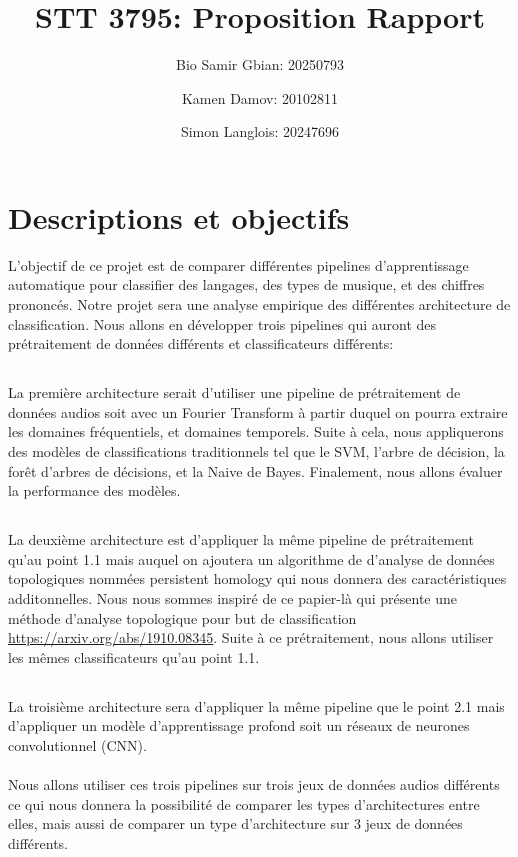 \documentclass{article}
\title{STT 3795: Proposition Rapport}
\author{Bio Samir Gbian: 20250793}
\author{Kamen Damov: 20102811}
\author{Simon Langlois: 20247696}
\affil{Département de mathématiques et statistiques}
\affil{Université de Montréal}
\begin{document}
\maketitle

\section{Descriptions et objectifs}
L'objectif de ce projet est de comparer différentes pipelines d'apprentissage automatique pour classifier des langages, des types de musique, et des chiffres prononcés. Notre projet sera une analyse empirique des différentes architecture de classification. Nous allons en développer trois pipelines qui auront des prétraitement de données différents et classificateurs différents:
\subsection{}
La première architecture serait d'utiliser une pipeline de prétraitement de données audios soit avec un Fourier Transform à partir duquel on pourra extraire les domaines fréquentiels, et domaines temporels. Suite à cela, nous appliquerons des modèles de classifications traditionnels tel que le SVM, l'arbre de décision, la forêt d'arbres de décisions, et la Naive de Bayes. Finalement, nous allons évaluer la performance des modèles. 
\subsection{}
La deuxième architecture est d'appliquer la même pipeline de prétraitement qu'au point 1.1 mais auquel on ajoutera un algorithme de d'analyse de données topologiques nommées persistent homology qui nous donnera des caractéristiques additonnelles. Nous nous sommes inspiré de ce papier-là qui présente une méthode d'analyse topologique pour but de classification \url{https://arxiv.org/abs/1910.08345}. Suite à ce prétraitement, nous allons utiliser les mêmes classificateurs qu'au point 1.1.
\subsection{}
La troisième architecture sera d'appliquer la même pipeline que le point 2.1 mais d'appliquer un modèle d'apprentissage profond soit un réseaux de neurones convolutionnel (CNN).\\\\
Nous allons utiliser ces trois pipelines sur trois jeux de données audios différents ce qui nous donnera la possibilité de comparer les types d'architectures entre elles, mais aussi de comparer un type d'architecture sur 3 jeux de données différents. 
\end{document}
